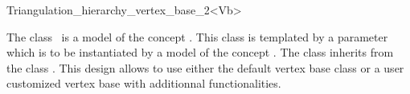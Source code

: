 

\begin{ccRefClass}{Triangulation_hierarchy_vertex_base_2<Vb>}


\ccDefinition
  
The class \ccRefName\ is a model of the concept
.
This class is templated by a parameter 
which is to be instantiated by a model of  the concept
.
The class  inherits
from the class .
This design allows to use either the default
vertex base class or a user customized
vertex base with additionnal functionalities.


\ccIsModel
{}

\ccInheritsFrom
{}

\ccTypes
{}

\ccSeeAlso
{} \\
 \\




\end{ccRefClass}


